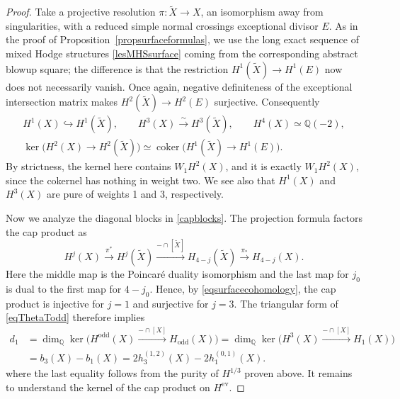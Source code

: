 \documentclass{amsart}
\theoremstyle{plain}
\theoremstyle{definition}
\newcommand{\bbQ}{\mathbb{Q}}
\begin{document}
\begin{proof}
Take a projective resolution $\pi:\widetilde X\to X$, an isomorphism away from singularities, with a reduced simple normal crossings exceptional divisor $E$. As in the proof of Proposition~\ref{propsurfaceformulas}, we use the long exact sequence of mixed Hodge structures \eqref{lesMHSsurface} coming from the corresponding abstract blowup square; the difference is that the restriction
$H^1(\widetilde X)\to H^1(E)$ now does not necessarily vanish. Once again, negative definiteness of the exceptional intersection matrix makes
$H^2(\widetilde X)\to H^2(E)$ surjective. Consequently
\begin{equation}\label{eqsurfacecohomology}
\begin{gathered}
H^1(X)\hookrightarrow H^1(\widetilde X),\qquad
H^3(X)\xrightarrow{\sim}H^3(\widetilde X),\qquad
H^4(X)\simeq\bbQ(-2),\\
\ker\bigl(H^2(X)\to H^2(\widetilde X)\bigr)
\simeq\operatorname{coker}\bigl(H^1(\widetilde X)\to H^1(E)\bigr).
\end{gathered}
\end{equation}
By strictness, the kernel here contains $W_1H^2(X)$, and it is exactly $W_1H^2(X)$, since the cokernel has nothing in weight two. We see also that $H^1(X)$ and $H^3(X)$ are pure of weights 1 and 3, respectively.

Now we analyze the diagonal blocks in \eqref{capblocks}.
The projection formula factors the cap product as
\[
H^j(X)\xrightarrow{\pi^*}H^j(\widetilde X)
\xrightarrow{-\cap[\widetilde X]}H_{4-j}(\widetilde X)
\xrightarrow{\pi_*}H_{4-j}(X).
\]
Here the middle map is the Poincar\'e duality isomorphism and the last map for $j_0$ is dual to the first map for $4-j_0$. Hence, by \eqref{eqsurfacecohomology}, the cap product is injective for $j=1$ and surjective for $j=3$. The triangular form of
\eqref{eqThetaTodd} therefore implies
\[
\begin{aligned}
d_1
&=\dim_\bbQ\ker\bigl(
H^{\mathrm{odd}}(X)\xrightarrow{-\cap[X]}H_{\mathrm{odd}}(X)
\bigr)
=\dim_\bbQ\ker\bigl(
H^3(X)\xrightarrow{-\cap[X]}H_1(X)
\bigr)\\
&=b_3(X)-b_1(X)
=2h_3^{(1,2)}(X)-2h_1^{(0,1)}(X).
\end{aligned}
\]
where the last equality follows from the purity of $H^{1/3}$ proven above. It remains to understand the kernel of the cap product on $H^\mathrm{ev}$.


\end{proof}
\end{document}
